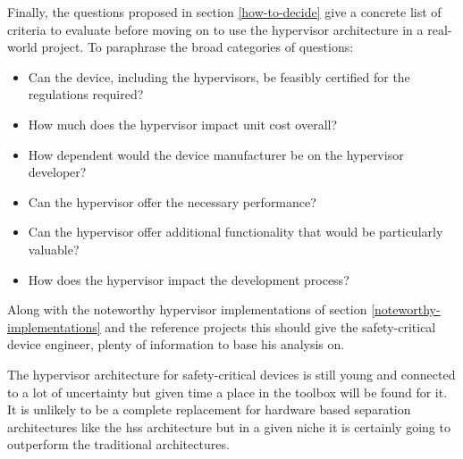 Finally, the questions proposed in section \ref{how-to-decide} give a concrete list of criteria to evaluate before moving on to use the hypervisor architecture in a real-world project. To paraphrase the broad categories of questions:
\begin{itemize}
    \item Can the device, including the hypervisors, be feasibly certified for the regulations required?
    \item How much does the hypervisor impact unit cost overall?
    \item How dependent would the device manufacturer be on the hypervisor developer?
    \item Can the hypervisor offer the necessary performance?
    \item Can the hypervisor offer additional functionality that would be particularly valuable?
    \item How does the hypervisor impact the development process?
\end{itemize}
Along with the noteworthy hypervisor implementations of section \ref{noteworthy-implementations} and the reference projects this should give the safety-critical device engineer, plenty of information to base his analysis on. 

The hypervisor architecture for safety-critical devices is still young and connected to a lot of uncertainty but given time a place in the toolbox will be found for it. It is unlikely to be a complete replacement for hardware based separation architectures like the \acrshort{hss} architecture but in a given niche it is certainly going to outperform the traditional architectures.


\begin{comment} 
* Mixed criticality has been present for a long time in very complex projects but with increased processing power and user demands it makes more and more sense in smaller devices.
* For this reason and because of efforts in some industries to save SWaP alternate solutions to the mixed criticality problem have been seeing some adoption.
* One of these is the hypervisor that this thesis set out to compare more in-depth.
* From that comparison the crucial differences and their effects emerged
* [Refer to conclusion from that section]
* Based on this some reference project have been proposed that can be categorized into these [] categories.
* Ultimately it can be said the hypervisor has a couple of very promising places of application.
* So it can be said the best scenarios for the hypervisor architecture are the ones where this happens: []
* The advent of microkernel based safety hypervisors along with the maturation in virtualization technology, especially in the embedded space provides an avenue to deal with the problems that arise from mixed criticality.
\end{comment}
